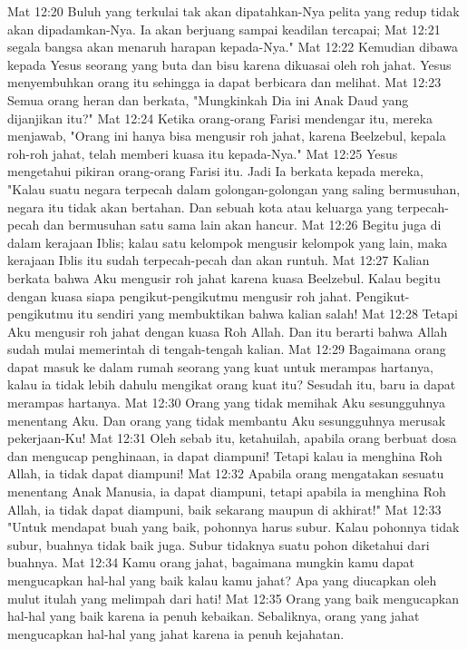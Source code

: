 Mat 12:20  Buluh yang terkulai tak akan dipatahkan-Nya pelita yang redup tidak akan dipadamkan-Nya. Ia akan berjuang sampai keadilan tercapai;
Mat 12:21  segala bangsa akan menaruh harapan kepada-Nya."
Mat 12:22  Kemudian dibawa kepada Yesus seorang yang buta dan bisu karena dikuasai oleh roh jahat. Yesus menyembuhkan orang itu sehingga ia dapat berbicara dan melihat.
Mat 12:23  Semua orang heran dan berkata, "Mungkinkah Dia ini Anak Daud yang dijanjikan itu?"
Mat 12:24  Ketika orang-orang Farisi mendengar itu, mereka menjawab, "Orang ini hanya bisa mengusir roh jahat, karena Beelzebul, kepala roh-roh jahat, telah memberi kuasa itu kepada-Nya."
Mat 12:25  Yesus mengetahui pikiran orang-orang Farisi itu. Jadi Ia berkata kepada mereka, "Kalau suatu negara terpecah dalam golongan-golongan yang saling bermusuhan, negara itu tidak akan bertahan. Dan sebuah kota atau keluarga yang terpecah-pecah dan bermusuhan satu sama lain akan hancur.
Mat 12:26  Begitu juga di dalam kerajaan Iblis; kalau satu kelompok mengusir kelompok yang lain, maka kerajaan Iblis itu sudah terpecah-pecah dan akan runtuh.
Mat 12:27  Kalian berkata bahwa Aku mengusir roh jahat karena kuasa Beelzebul. Kalau begitu dengan kuasa siapa pengikut-pengikutmu mengusir roh jahat. Pengikut-pengikutmu itu sendiri yang membuktikan bahwa kalian salah!
Mat 12:28  Tetapi Aku mengusir roh jahat dengan kuasa Roh Allah. Dan itu berarti bahwa Allah sudah mulai memerintah di tengah-tengah kalian.
Mat 12:29  Bagaimana orang dapat masuk ke dalam rumah seorang yang kuat untuk merampas hartanya, kalau ia tidak lebih dahulu mengikat orang kuat itu? Sesudah itu, baru ia dapat merampas hartanya.
Mat 12:30  Orang yang tidak memihak Aku sesungguhnya menentang Aku. Dan orang yang tidak membantu Aku sesungguhnya merusak pekerjaan-Ku!
Mat 12:31  Oleh sebab itu, ketahuilah, apabila orang berbuat dosa dan mengucap penghinaan, ia dapat diampuni! Tetapi kalau ia menghina Roh Allah, ia tidak dapat diampuni!
Mat 12:32  Apabila orang mengatakan sesuatu menentang Anak Manusia, ia dapat diampuni, tetapi apabila ia menghina Roh Allah, ia tidak dapat diampuni, baik sekarang maupun di akhirat!"
Mat 12:33  "Untuk mendapat buah yang baik, pohonnya harus subur. Kalau pohonnya tidak subur, buahnya tidak baik juga. Subur tidaknya suatu pohon diketahui dari buahnya.
Mat 12:34  Kamu orang jahat, bagaimana mungkin kamu dapat mengucapkan hal-hal yang baik kalau kamu jahat? Apa yang diucapkan oleh mulut itulah yang melimpah dari hati!
Mat 12:35  Orang yang baik mengucapkan hal-hal yang baik karena ia penuh kebaikan. Sebaliknya, orang yang jahat mengucapkan hal-hal yang jahat karena ia penuh kejahatan.
